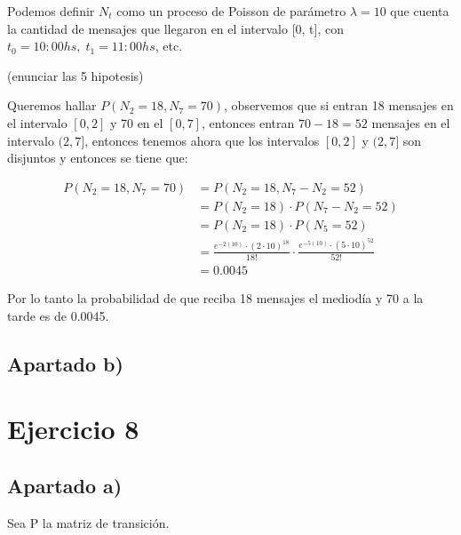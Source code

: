\documentclass[11pt]{article}
\begin{document}
Podemos definir $N_t$ como un proceso de Poisson de parámetro $\lambda = 10$ que
cuenta la cantidad de mensajes que llegaron en el intervalo [0, t], con $t_0 = 10:00hs, \;
t_1 = 11:00hs$, etc. 

(enunciar las 5 hipotesis)

Queremos hallar $ P(N_2 = 18, N_7 = 70) $, observemos que si entran 18 mensajes en
el intervalo $[0, 2]$ y 70 en el $[0, 7]$, entonces entran $70 - 18 = 52$ mensajes en
el intervalo $(2, 7]$, entonces tenemos ahora que los intervalos $[0, 2] $ y $ (2, 7] $
son disjuntos y entonces se tiene que:

\begin{align*}
  P(N_2 = 18, N_7 = 70) &= P(N_2 = 18, N_7 - N_2 = 52) \\
                        &= P(N_2 = 18) \cdot P(N_7 - N_2 = 52) \\
                        &= P(N_2 = 18) \cdot P(N_5 = 52) \\
                        &= \frac{e^{-2(10)} \cdot (2 \cdot 10)^{18}}{18!} \cdot \frac{e^{-5(10)} \cdot (5 \cdot 10)^{52}}{52!} \\
                        &= 0.0045
\end{align*}

Por lo tanto la probabilidad de que reciba 18 mensajes el mediodía y 70 a la tarde es de 0.0045.


\subsection*{Apartado b)}


\section{Ejercicio 8}

\subsection*{Apartado a)}

Sea P la matriz de transición.
\end{document}
